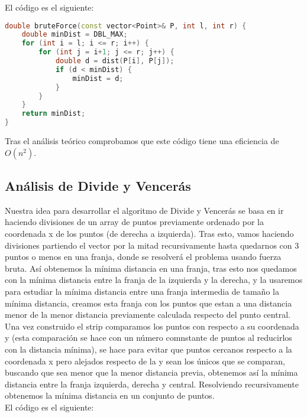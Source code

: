 \documentclass[a4paper,12pt]{article}
\begin{document}
El código es el siguiente:

\begin{lstlisting}[language=C++, caption={Brute Force de \textbf{``El par de puntos más cercan''}}]
double bruteForce(const vector<Point>& P, int l, int r) {
	double minDist = DBL_MAX;
	for (int i = l; i <= r; i++) {
		for (int j = i+1; j <= r; j++) {
			double d = dist(P[i], P[j]);
			if (d < minDist) {
				minDist = d;
			}
		}
	}
	return minDist;
}
\end{lstlisting}

Tras el análisis teórico comprobamos que este código tiene una eficiencia de $O(n^2)$.

\subsection{Análisis de Divide y Vencerás}
Nuestra idea para desarrollar el algoritmo de Divide y Vencerás se basa en ir haciendo divisiones
de un array de puntos previamente ordenado por la coordenada x de los puntos (de derecha a izquierda).
Tras esto, vamos haciendo divisiones partiendo el vector por la mitad recursivamente hasta quedarnos con 3 
puntos o menos en una franja, donde se resolverá el problema usando fuerza bruta. Así obtenemos la mínima distancia 
en una franja, tras esto nos quedamos con la mínima distancia entre la franja de la izquierda y la derecha, y la 
usaremos para estudiar la mínima distancia entre una franja intermedia de tamaño la mínima distancia, creamos esta franja 
con los puntos que estan a una distancia menor de la menor distancia previamente calculada respecto del punto central.
Una vez construido el strip comparamos los puntos con respecto a su coordenada y (esta comparación se hace con un 
número comnstante de puntos al reducirlos con la distancia mínima), se hace para evitar que puntos cercanos respecto a 
la coordenada x pero alejados respecto de la y sean los únicos que se comparan, buscando que sea menor que la menor distancia previa,
obtenemos así la mínima distancia entre la franja izquierda, derecha y central. Resolviendo recursivamente obtenemos 
la mínima distancia en un conjunto de puntos. \\

El código es el siguiente:
\end{document}
